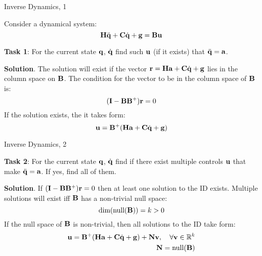 \documentclass{beamer}
\begin{document}
\begin{frame}{Inverse Dynamics, 1}
	\begin{flushleft}
		
		Consider a dynamical system:
		\begin{equation}
			\mathbf{H} \ddot{\mathbf{q}} + \mathbf{C}\dot{\mathbf{q}} + \mathbf{g} = \mathbf{B}\mathbf{u}
		\end{equation}		
		
		\textbf{Task 1}: 
		For the current state $\mathbf{q}$, $\dot{\mathbf{q}}$ find such $\mathbf{u}$ (if it exists) that $\ddot{\mathbf{q}} = \mathbf{a}$.
		
		\bigskip
		
		\textbf{Solution}. The solution will exist if the vector $\mathbf{r} = \mathbf{H} \mathbf{a} + \mathbf{C}\dot{\mathbf{q}} + \mathbf{g} $ lies in the column space on $\mathbf{B}$. The condition for the vector to be in the column space of $\mathbf{B}$ is:
		\begin{equation}
			(\mathbf{I} - \mathbf{B}\mathbf{B}^+)\mathbf{r} = 0
		\end{equation}		
		If the solution exists, the it takes form:
		\begin{equation}
			\mathbf{u} = \mathbf{B}^+ (\mathbf{H} \mathbf{a} + \mathbf{C}\dot{\mathbf{q}} + \mathbf{g} )
		\end{equation}		
		
	\end{flushleft}
\end{frame}




\begin{frame}{Inverse Dynamics, 2}
	\begin{flushleft}
		
		\textbf{Task 2}: 
		For the current state $\mathbf{q}$, $\dot{\mathbf{q}}$ find if there exist multiple controls $\mathbf{u}$ that make $\ddot{\mathbf{q}} = \mathbf{a}$. If yes, find all of them.
		
		\bigskip
		
		\textbf{Solution}. If $(\mathbf{I} - \mathbf{B}\mathbf{B}^+)\mathbf{r} = 0$ then at least one solution to the ID exists. Multiple solutions will exist iff $\mathbf{B}$ has a non-trivial null space:
		\begin{equation}
			\text{dim}(\text{null}(\mathbf{B})) = k > 0
		\end{equation}		
		If the null space of $\mathbf{B}$ is non-trivial, then all solutions to the ID take form:
		\begin{align}
			\mathbf{u} = \mathbf{B}^+ (\mathbf{H} \mathbf{a} + \mathbf{C}\dot{\mathbf{q}} + \mathbf{g} ) + 
			\mathbf{N}\mathbf{v}, \ \ \ \forall \mathbf{v} \in \mathbb{R}^k
			\\
			\mathbf{N} = \text{null}(\mathbf{B})
		\end{align}		
		
	\end{flushleft}
\end{frame}
\end{document}
